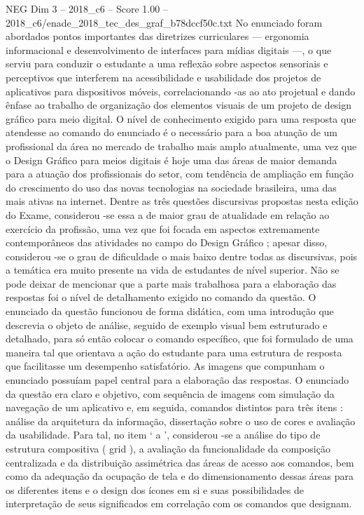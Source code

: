 \begin{textsample}{NEG Dim 3 – 2018\_c6 – Score 1.00 – 2018\_c6/enade\_2018\_tec\_des\_graf\_b78dccf50c.txt}
No enunciado foram abordados pontos importantes das diretrizes curriculares — ergonomia informacional e desenvolvimento de interfaces para mídias digitais —, o que serviu para conduzir o estudante a uma reflexão sobre aspectos sensoriais e perceptivos que interferem na acessibilidade e usabilidade dos projetos de aplicativos para dispositivos móveis, correlacionando -as ao ato projetual e dando ênfase ao trabalho de organização dos elementos visuais de um projeto de design gráfico para meio digital.
O nível de conhecimento exigido para uma resposta que atendesse ao comando do enunciado é o necessário para a boa atuação de um profissional da área no mercado de trabalho mais amplo atualmente, uma vez que o Design Gráfico para meios digitais é hoje uma das áreas de maior demanda para a atuação dos profissionais do setor, com tendência de ampliação em função do crescimento do uso das novas tecnologias na sociedade brasileira, uma das mais ativas na internet.
Dentre as três questões discursivas propostas nesta edição do Exame, considerou -se essa a de maior grau de atualidade em relação ao exercício da profissão, uma vez que foi focada em aspectos extremamente contemporâneos das atividades no campo do Design Gráfico ; apesar disso, considerou -se o grau de dificuldade o mais baixo dentre todas as discursivas, pois a temática era muito presente na vida de estudantes de nível superior.
Não se pode deixar de mencionar que a parte mais trabalhosa para a elaboração das respostas foi o nível de detalhamento exigido no comando da questão.
O enunciado da questão funcionou de forma didática, com uma introdução que descrevia o objeto de análise, seguido de exemplo visual bem estruturado e detalhado, para só então colocar o comando específico, que foi formulado de uma maneira tal que orientava a ação do estudante para uma estrutura de resposta que facilitasse um desempenho satisfatório.
As imagens que compunham o enunciado possuíam papel central para a elaboração das respostas.
O enunciado da questão era claro e objetivo, com sequência de imagens com simulação da navegação de um aplicativo e, em seguida, comandos distintos para três itens : análise da arquitetura da informação, dissertação sobre o uso de cores e avaliação da usabilidade.
Para tal, no item ‘ a ’, considerou -se a análise do tipo de estrutura compositiva ( grid ), a avaliação da funcionalidade da composição centralizada e da distribuição assimétrica das áreas de acesso aos comandos, bem como da adequação da ocupação de tela e do dimensionamento dessas áreas para os diferentes itens e o design dos ícones em si e suas possibilidades de interpretação de seus significados em correlação com os comandos que designam.

\end{textsample}

